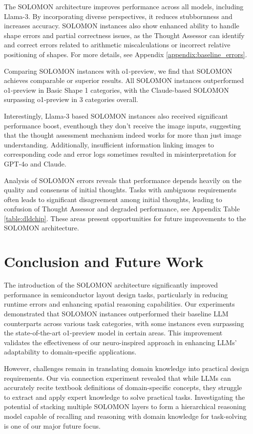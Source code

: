 \documentclass{article}
\begin{document}
The SOLOMON architecture improves performance across all models, including Llama-3. By incorporating diverse perspectives, it reduces stubbornness and increases accuracy. SOLOMON instances also show enhanced ability to handle shape errors and partial correctness issues, as the Thought Assessor can identify and correct errors related to arithmetic miscalculations or incorrect relative positioning of shapes. For more details, see Appendix \ref{appendix:baseline_errors}.

Comparing SOLOMON instances with o1-preview, we find that SOLOMON achieves comparable or superior results. All SOLOMON instances outperformed o1-preview in Basic Shape 1 categories, with the Claude-based SOLOMON surpassing o1-preview in 3 categories overall. 

Interestingly, Llama-3 based SOLOMON instances also received significant performance boost, eventhough they don't receive the image inputs, suggesting that the thought assessment mechanism indeed works for more than just image understanding. Additionally, insufficient information linking images to corresponding code and error logs sometimes resulted in misinterpretation for GPT-4o and Claude.

Analysis of SOLOMON errors reveals that performance depends heavily on the quality and consensus of initial thoughts. Tasks with ambiguous requirements often leads to significant disagreement among initial thoughts, leading to confusion of Thought Assessor and degraded performance, see Appendix Table \ref{table:dldchip}. These areas present opportunities for future improvements to the SOLOMON architecture.

\section{Conclusion and Future Work}
The introduction of the SOLOMON architecture significantly improved performance in semiconductor layout design tasks, particularly in reducing runtime errors and enhancing spatial reasoning capabilities. Our experiments demonstrated that SOLOMON instances outperformed their baseline LLM counterparts across various task categories, with some instances even surpassing the state-of-the-art o1-preview model in certain areas. This improvement validates the effectiveness of our neuro-inspired approach in enhancing LLMs' adaptability to domain-specific applications.

However, challenges remain in translating domain knowledge into practical design requirements. Our via connection experiment revealed that while LLMs can accurately recite textbook definitions of domain-specific concepts, they struggle to extract and apply expert knowledge to solve practical tasks. Investigating the potential of stacking multiple SOLOMON layers to form a hierarchical reasoning model capable of recalling and reasoning with domain knowledge for task-solving is one of our major future focus.
\end{document}
